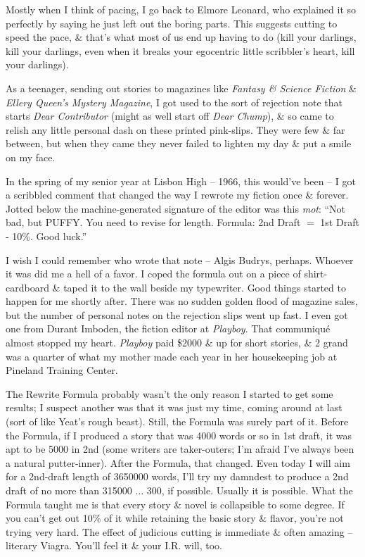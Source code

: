 \documentclass{article}
\numberwithin{equation}{section}
\begin{document}
Mostly when I think of pacing, I go back to Elmore Leonard, who explained it so perfectly by saying he just left out the boring parts. This suggests cutting to speed the pace, \& that's what most of us end up having to do (kill your darlings, kill your darlings, even when it breaks your egocentric little scribbler's heart, kill your darlings).

As a teenager, sending out stories to magazines like \textit{Fantasy \& Science Fiction} \& \textit{Ellery Queen's Mystery Magazine}, I got used to the sort of rejection note that starts \textit{Dear Contributor} (might as well start off \textit{Dear Chump}), \& so came to relish any little personal dash on these printed pink-slips. They were few \& far between, but when they came they never failed to lighten my day \& put a smile on my face.

In the spring of my senior year at Lisbon High -- 1966, this would've been -- I got a scribbled comment that changed the way I rewrote my fiction once \& forever. Jotted below the machine-generated signature of the editor was this \textit{mot}: ``Not bad, but PUFFY. You need to revise for length. Formula: 2nd Draft $=$ 1st Draft - 10\%. Good luck.''

I wish I could remember who wrote that note -- Algis Budrys, perhaps. Whoever it was did me a hell of a favor. I coped the formula out on a piece of shirt-cardboard \& taped it to the wall beside my typewriter. Good things started to happen for me shortly after. There was no sudden golden flood of magazine sales, but the number of personal notes on the rejection slips went up fast. I even got one from Durant Imboden, the fiction editor at \textit{Playboy}. That communiqu\'e almost stopped my heart. \textit{Playboy} paid \$2000 \& up for short stories, \& 2 grand was a quarter of what my mother made each year in her housekeeping job at Pineland Training Center.

The Rewrite Formula probably wasn't the only reason I started to get some results; I suspect another was that it was just my time, coming around at last (sort of like Yeat's rough beast). Still, the Formula was surely part of it. Before the Formula, if I produced a story that was 4000 words or so in 1st draft, it was apt to be 5000 in 2nd (some writers are taker-outers; I'm afraid I've always been a natural putter-inner). After the Formula, that changed. Even today I will aim for a 2nd-draft length of 3650000 words, I'll try my damndest to produce a 2nd draft of no more than 315000 $\ldots$ 300, if possible. Usually it is possible. What the Formula taught me is that every story \& novel is collapsible to some degree. If you can't get out 10\% of it while retaining the basic story \& flavor, you're not trying very hard. The effect of judicious cutting is immediate \& often amazing -- literary Viagra. You'll feel it \& your I.R. will, too.
\end{document}
